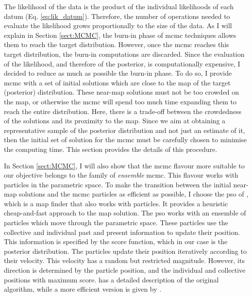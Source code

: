 The likelihood of the data is the product of the individual likelihoods of each datum (Eq. \ref{eq:lik_datum}). Therefore, the number of operations needed to evaluate the likelihood grows proportionally to the size of the data. As I will explain in Section \ref{sect:MCMC}, the burn-in phase of \gls{mcmc} techniques allows them to reach the target distribution. However, once the \gls{mcmc} reaches this target distribution, the burn-in computations are discarded. Since the evaluation of the likelihood, and therefore of the posterior, is computationally expensive, I decided to reduce as much as possible the burn-in phase. To do so, I provide \gls{mcmc} with a set of initial solutions which are close to the \gls{map} of the target (posterior) distribution. These near-\gls{map} solutions must not be too crowded on the \gls{map}, or otherwise the \gls{mcmc} will spend too much time expanding them to reach the entire distribution. Here, there is a trade-off between the crowdedness of the solutions and its proximity to the \gls{map}. Since we aim at obtaining a representative sample of the posterior distribution and not just an estimate of it, then the initial set of solution for the \gls{mcmc} must be carefully chosen to minimise the computing time. This section provides the details of this procedure. 

{In Section \ref{sect:MCMC}, I will also show that the \gls{mcmc} flavour more suitable to our objective belongs to the family of \emph{ensemble} \gls{mcmc}. This flavour works with particles in the parametric space. To make the transition between the initial near-\gls{map} solutions and the  \gls{mcmc} particles as efficient as possible, I choose the \gls{pso} of  \citet{Kennedy1995}, which is a \gls{map} finder that also works with particles. It provides a heuristic cheap-and-fast approach to the \gls{map} solution. The \gls{pso} works with an ensemble of particles which move through the parametric space.} These particles use the collective and individual past and present information to update their position. This information is specified by the score function, which in our case is the posterior distribution. The particles update their position iteratively according to their velocity. This velocity has a random but restricted magnitude. However, its direction is determined by the particle position, and the individual and collective positions with maximum score. \citet{Kennedy1995} has a detailed description of the original algorithm, while a more efficient version is given by \citep{Clerc2002}.

